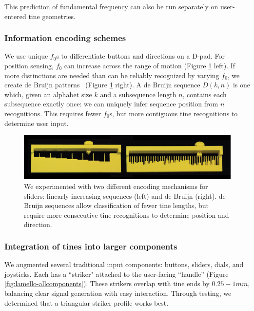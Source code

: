     This prediction of fundamental frequency can also be run separately on user-entered tine geometries.

        \subsubsection{Information encoding schemes}
        
        We use unique $f_0$s to differentiate buttons and directions on a D-pad. For position sensing, $f_0$ can increase across the range of motion (Figure \ref{fig:lamello-sliders} left). If more distinctions are needed than can be reliably recognized by varying $f_0$, we create de Bruijn patterns~\cite{debruijn-seqproof} (Figure \ref{fig:lamello-sliders} right). A de Bruijn sequence $D(k,n)$ is one which, given an alphabet size $k$ and a subsequence length $n$, contains each subsequence exactly once: we can uniquely infer sequence position from $n$ recognitions. This requires fewer $f_0$s, but more contiguous tine recognitions to determine user input.
        
        \begin{figure}
  \centering
    \includegraphics[width=\textwidth]{figures/lamello/2sliders-sidebyside.jpg}
  \caption{We experimented with two different encoding mechanisms for sliders: linearly increasing sequences (left) and de Bruijn (right). de Bruijn sequences allow classification of fewer tine lengths, but require more consecutive tine recognitions to determine position and direction.}
  \label{fig:lamello-sliders}
\end{figure}

        \subsubsection{Integration of tines into larger components}

        We augmented several traditional input components: buttons, sliders, dials, and joysticks. Each has a ``striker" attached to the user-facing ``handle'' (Figure \ref{fig:lamello-allcomponents}). These strikers overlap with tine ends by $0.25-1mm$, balancing clear signal generation with easy interaction. Through testing, we determined that a triangular striker profile works best.


